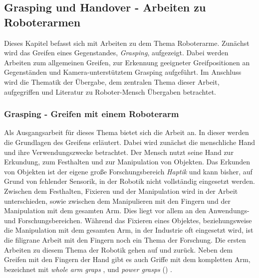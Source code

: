 \subsection{Grasping und Handover - Arbeiten zu Roboterarmen}
\label{sec:relatedwork-handover}
Dieses Kapitel befasst sich mit Arbeiten zu dem Thema Roboterarme. Zunächst wird das Greifen eines Gegenstandes, \textit{Grasping}, aufgezeigt. Dabei werden Arbeiten zum allgemeinen Greifen, zur Erkennung geeigneter Greifpositionen an Gegenständen und Kamera-unterstütztem Grasping aufgeführt. Im Anschluss wird die Thematik der Übergabe, dem zentralen Thema dieser Arbeit, aufgegriffen und Literatur zu Roboter-Mensch Übergaben betrachtet.

\subsubsection{Grasping - Greifen mit einem Roboterarm}
Als Ausgangsarbeit für dieses Thema bietet sich die Arbeit \cite{bicchi2000robotic} an. In dieser werden die Grundlagen des Greifens erläutert. Dabei wird zunächst die menschliche Hand und ihre Verwendungszwecke betrachtet. Der Mensch nutzt seine Hand zur Erkundung, zum Festhalten und zur Manipulation von Objekten. Das Erkunden von Objekten ist der eigene große Forschungsbereich \textit{Haptik} und kann bisher, auf Grund von fehlender Sensorik, in der Robotik nicht vollständig eingesetzt werden. Zwischen dem Festhalten, Fixieren und der Manipulation wird in der Arbeit unterschieden, sowie zwischen dem Manipulieren mit den Fingern und der Manipulation mit dem gesamten Arm. Dies liegt vor allem an den Anwendungs- und Forschungsbereichen. Während das Fixieren eines Objektes, beziehungsweise die Manipulation mit dem gesamten Arm, in der Industrie oft eingesetzt wird, ist die filigrane Arbeit mit den Fingern noch ein Thema der Forschung. Die ersten Arbeiten zu diesem Thema der Robotik gehen auf \cite{asada1979studies}  und \cite{mason1985robot} zurück. Neben dem Greifen mit den Fingern der Hand gibt es auch Griffe mit dem kompletten Arm, bezeichnet mit \textit{whole arm graps} \citep{townsend1988effect}, \citep{bicchi1994problem} und \textit{power grasps} (\citep{mirza1990force}) \citep{bicchi2000robotic}. 

